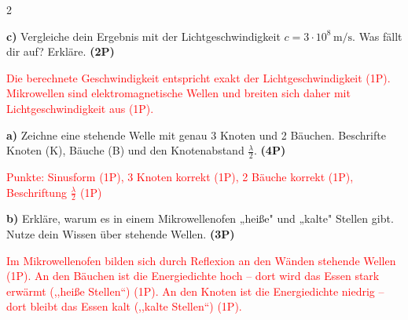 \documentclass[11pt,a4paper]{article}
\begin{document}
\begin{multicols}{2}
\begin{tcolorbox}[colback=white,colframe=black,coltitle=black,colbacktitle=white,
    title=\textbf{3: Wellenlängenbestimmung mit Mikrowellen}]
\vspace{0.3cm}

\textbf{c)} Vergleiche dein Ergebnis mit der Lichtgeschwindigkeit $c = 3 \cdot 10^8\,\mathrm{m/s}$. Was fällt dir auf? Erkläre. \textbf{(2P)}

\textcolor{red}{Die berechnete Geschwindigkeit entspricht exakt der Lichtgeschwindigkeit {\color{blue}(1P)}. Mikrowellen sind elektromagnetische Wellen und breiten sich daher mit Lichtgeschwindigkeit aus {\color{blue}(1P)}.}

\end{tcolorbox}

\begin{tcolorbox}[colback=white,colframe=black,coltitle=black,colbacktitle=white,
    title=\textbf{4: Anwendung und Transfer}]

\textbf{a)} Zeichne eine stehende Welle mit genau 3 Knoten und 2 Bäuchen. Beschrifte Knoten (K), Bäuche (B) und den Knotenabstand $\frac{\lambda}{2}$. \textbf{(4P)}

\vspace{0.2cm}
\begin{center}
\end{center}

\textcolor{red}{Punkte: Sinusform {\color{blue}(1P)}, 3 Knoten korrekt {\color{blue}(1P)}, 2 Bäuche korrekt {\color{blue}(1P)}, Beschriftung $\frac{\lambda}{2}$ {\color{blue}(1P)}}

\vspace{0.2cm}

\textbf{b)} Erkläre, warum es in einem Mikrowellenofen „heiße" und „kalte" Stellen gibt. Nutze dein Wissen über stehende Wellen. \textbf{(3P)}

\textcolor{red}{Im Mikrowellenofen bilden sich durch Reflexion an den Wänden stehende Wellen {\color{blue}(1P)}. An den Bäuchen ist die Energiedichte hoch -- dort wird das Essen stark erwärmt (,,heiße Stellen``) {\color{blue}(1P)}. An den Knoten ist die Energiedichte niedrig -- dort bleibt das Essen kalt (,,kalte Stellen``) {\color{blue}(1P)}.}


\end{tcolorbox}
\end{multicols}
\end{document}
